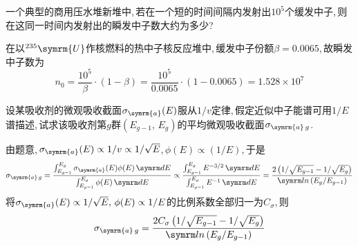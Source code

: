 \begin{exercise}
    一个典型的商用压水堆新堆中,\,若在一个短的时间间隔内发射出$10^5$个缓发中子,\,则在这同一时间内发射出的瞬发中子数大约为多少?
    \begin{solution}
        在以${}^{235}\symrm{U}$作核燃料的热中子核反应堆中,\,缓发中子份额$\beta = 0.0065$,\,故瞬发中子数为
        \begin{equation*}
            n_0 = \frac{10^5}{\beta} \cdot (1-\beta) = \frac{10^5}{0.0065} \cdot (1-0.0065) = 1.528 \times 10^{7}
        \end{equation*}
    \end{solution}
\end{exercise}

\begin{exercise}
    设某吸收剂的微观吸收截面$\sigma_{\symrm{a}}(E)$服从$1/v$定律,\,假定近似中子能谱可用$1/E$谱描述,\,试求该吸收剂第$g$群$(E_{g-1},\,E_g)$的平均微观吸收截面$\sigma_{\symrm{a}\,g}$.\,
    \begin{solution}
        由题意,\,$\sigma_{\symrm{a}}(E) \propto 1/v \propto 1/\sqrt{E}$,\,$\phi(E) \propto (1/E)$,\,于是
        \begin{equation*}
            \sigma_{\symrm{a}\,g} = \frac{\int_{E_{g-1}}^{E_g} \sigma_{\symrm{a}}(E) \phi(E) \dd{E}}{\int_{E_{g-1}}^{E_g} \phi(E) \dd{E}} \propto \frac{\int_{E_{g-1}}^{E_g} E^{-3/2} \dd{E}}{\int_{E_{g-1}}^{E_g} E^{-1} \dd{E}} = \frac{2\left(1/\sqrt{E_{g-1}} - 1/\sqrt{E_g}\right)}{\loge \left(E_g / E_{g-1}\right)}
        \end{equation*}
        将$\sigma_{\symrm{a}}(E) \propto 1/\sqrt{E},\,\phi(E) \propto 1/E$的比例系数全部归一为$C_{\sigma}$,\,则
        \begin{equation*}
            \sigma_{\symrm{a}\,g} = \frac{2 C_{\sigma} \left(1/\sqrt{E_{g-1}} - 1/\sqrt{E_g}\right)}{\loge \left(E_g / E_{g-1}\right)}
        \end{equation*}
    \end{solution}
\end{exercise}